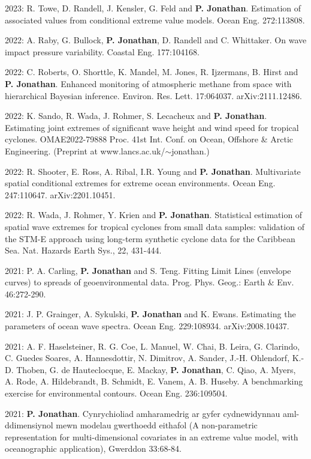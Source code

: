\documentclass[11pt,a4paper]{moderncv}
\begin{document}
2023: R. Towe, D. Randell, J. Kensler, G. Feld and \textbf{P. Jonathan}. Estimation of associated values from conditional extreme value models. Ocean Eng. 272:113808.

2022: A. Raby, G. Bullock, \textbf{P. Jonathan}, D. Randell and C. Whittaker. On wave impact pressure variability. Coastal Eng. 177:104168. 

2022: C. Roberts, O. Shorttle, K. Mandel, M. Jones, R. Ijzermans, B. Hirst and \textbf{P. Jonathan}. Enhanced monitoring of atmospheric methane from space with hierarchical Bayesian inference. Environ. Res. Lett. 17:064037. arXiv:2111.12486.

2022: K. Sando, R. Wada, J. Rohmer, S. Lecacheux and \textbf{P. Jonathan}. Estimating joint extremes of significant wave height and wind speed for tropical cyclones. OMAE2022-79888 Proc. 41st Int. Conf. on Ocean, Offshore \& Arctic Engineering. (Preprint at www.lancs.ac.uk/$\sim$jonathan.)

2022: R. Shooter, E. Ross, A. Ribal, I.R. Young and \textbf{P. Jonathan}. Multivariate spatial conditional extremes for extreme ocean environments. Ocean Eng. 247:110647. arXiv:2201.10451.

2022: R. Wada, J. Rohmer, Y. Krien and \textbf{P. Jonathan}. Statistical estimation of spatial wave extremes for tropical cyclones from small data samples: validation of the STM-E approach using long-term synthetic cyclone data for the Caribbean Sea. Nat. Hazards Earth Sys., 22, 431-444. 

2021: P. A. Carling, \textbf{P. Jonathan} and S. Teng. Fitting Limit Lines (envelope curves) to spreads of geoenvironmental data. Prog. Phys. Geog.: Earth \& Env. 46:272-290.

2021: J. P. Grainger, A. Sykulski, \textbf{P. Jonathan} and K. Ewans. Estimating the parameters of ocean wave spectra. Ocean Eng. 229:108934. arXiv:2008.10437.

2021: A. F. Haselsteiner, R. G. Coe, L. Manuel, W. Chai, B. Leira, G. Clarindo, C. Guedes Soares, A. Hannesdottir, N. Dimitrov, A. Sander, J.-H. Ohlendorf, K.-D. Thoben, G. de Hauteclocque, E. Mackay, \textbf{P. Jonathan}, C. Qiao, A. Myers, A. Rode, A. Hildebrandt, B. Schmidt, E. Vanem, A. B. Huseby. A benchmarking exercise for environmental contours. Ocean Eng. 236:109504.

2021: \textbf{P. Jonathan}. Cynrychioliad amharamedrig ar gyfer cydnewidynnau aml-ddimensiynol mewn modelau gwerthoedd eithafol (A non-parametric representation for multi-dimensional covariates in an extreme value model, with oceanographic application), Gwerddon 33:68-84. 
\end{document}
